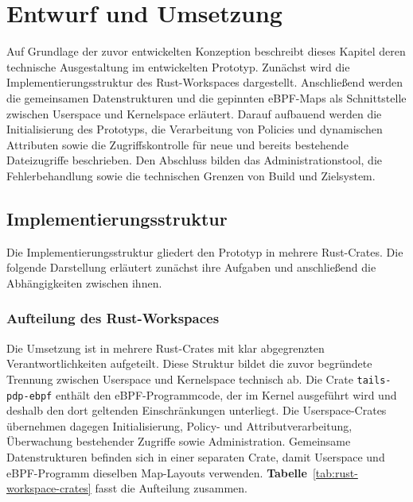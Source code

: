 \section{Entwurf und Umsetzung}

Auf Grundlage der zuvor entwickelten Konzeption beschreibt dieses Kapitel deren technische Ausgestaltung im entwickelten Prototyp.
Zunächst wird die Implementierungsstruktur des Rust-Workspaces dargestellt.
Anschließend werden die gemeinsamen Datenstrukturen und die gepinnten eBPF-Maps als Schnittstelle zwischen Userspace und Kernelspace erläutert.
Darauf aufbauend werden die Initialisierung des Prototyps, die Verarbeitung von Policies und dynamischen Attributen sowie die Zugriffskontrolle für neue und bereits bestehende Dateizugriffe beschrieben.
Den Abschluss bilden das Administrationstool, die Fehlerbehandlung sowie die technischen Grenzen von Build und Zielsystem.

\subsection{Implementierungsstruktur}\label{sec:implementierungsstruktur}
Die Implementierungsstruktur gliedert den Prototyp in mehrere Rust-Crates. Die folgende Darstellung erläutert zunächst ihre Aufgaben und anschließend die Abhängigkeiten zwischen ihnen.

\subsubsection{Aufteilung des Rust-Workspaces}

Die Umsetzung ist in mehrere Rust-Crates mit klar abgegrenzten Verantwortlichkeiten aufgeteilt.
Diese Struktur bildet die zuvor begründete Trennung zwischen Userspace und Kernelspace technisch ab.
Die Crate \texttt{tails-pdp-ebpf} enthält den eBPF-Programmcode, der im Kernel ausgeführt wird und deshalb den dort geltenden Einschränkungen unterliegt.
Die Userspace-Crates übernehmen dagegen Initialisierung, Policy- und Attributverarbeitung, Überwachung bestehender Zugriffe sowie Administration.
Gemeinsame Datenstrukturen befinden sich in einer separaten Crate, damit Userspace und eBPF-Programm dieselben Map-Layouts verwenden. \textbf{Tabelle}~\ref{tab:rust-workspace-crates} fasst die Aufteilung zusammen.


